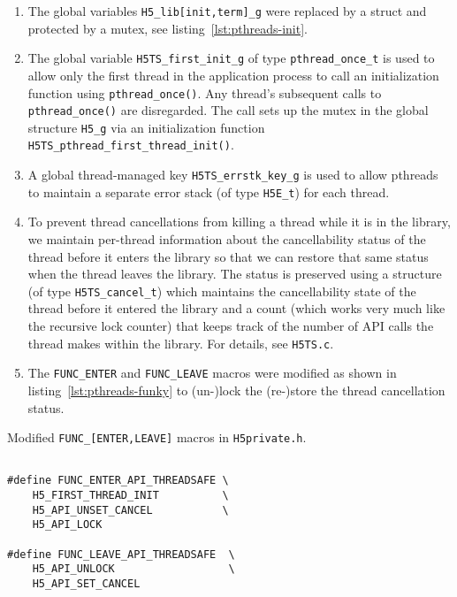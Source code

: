 \begin{enumerate}
    \item The global variables \texttt{H5\_lib[init,term]\_g} were replaced by a struct and protected by a mutex, see listing~\ref{lst:pthreads-init}.
    \item The global variable \texttt{H5TS\_first\_init\_g} of type \texttt{pthread\_once\_t} is used to allow only the first thread in the application process to call an initialization function using \texttt{pthread\_once()}. Any thread's subsequent calls to \texttt{pthread\_once()} are disregarded. The call sets up the mutex in the global structure \texttt{H5\_g} via an initialization function \texttt{H5TS\_pthread\_first\_thread\_init()}.
    \item A global thread-managed key \texttt{H5TS\_errstk\_key\_g} is used to allow pthreads to maintain a separate error stack (of type \texttt{H5E\_t}) for each thread.
    \item To prevent thread cancellations from killing a thread while it is in the library, we maintain per-thread information about the cancellability status of the thread before it enters the library so that we can restore that same status when the thread leaves the library. The status is preserved using a structure (of type \texttt{H5TS\_cancel\_t}) which maintains the cancellability state of the thread before it entered the library and a count (which works very much like the recursive lock counter) that keeps track of the number of API calls the thread makes within the library. For details, see \texttt{H5TS.c}.
    \item The \texttt{FUNC\_ENTER} and \texttt{FUNC\_LEAVE} macros were modified as shown in listing~\ref{lst:pthreads-funky} to (un-)lock the (re-)store the thread cancellation status.
\end{enumerate}


\begin{listing}
\centering
\caption{Modified \texttt{FUNC\_[ENTER,LEAVE]} macros in \texttt{H5private.h}.}
\label{lst:pthreads-funky}
\begin{verbatim}

#define FUNC_ENTER_API_THREADSAFE \
    H5_FIRST_THREAD_INIT          \
    H5_API_UNSET_CANCEL           \
    H5_API_LOCK

#define FUNC_LEAVE_API_THREADSAFE  \
    H5_API_UNLOCK                  \
    H5_API_SET_CANCEL

\end{verbatim}
\end{listing}

